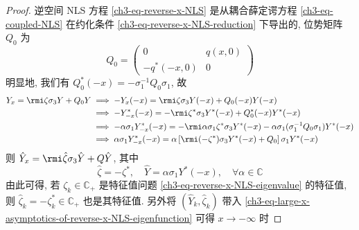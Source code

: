 \begin{proof}
    逆空间 NLS 方程 \eqref{ch3-eq-reverse-x-NLS} 是从耦合薛定谔方程 \eqref{ch3-eq-coupled-NLS} 在约化条件 \eqref{ch3-eq-reverse-x-NLS-reduction} 下导出的, 位势矩阵 $ Q_{0} $ 为
    \begin{equation}
        Q_{0} = \begin{pmatrix}
            0            & q(x,0) \\
            -q^{*}(-x,0) & 0
        \end{pmatrix}
    \end{equation}
    明显地, 我们有 $ Q_{0}^{*}(-x) = - \sigma^{-1}_{1} Q_{0} \sigma_{1} $, 故
    \begin{equation}
        \begin{aligned}
            Y_{x} = \rmi \zeta \sigma_{3} Y + Q_{0} Y & \implies -Y_{x}(-x) = \rmi \zeta \sigma_{3} Y(-x) + Q_{0}(-x)Y(-x)                                                                                                \\
                                                      & \implies -Y_{-x}^{*}(-x) = -\rmi \zeta^{*} \sigma_{3} Y^{*}(-x) + Q_{0}^{*}(-x)Y^{*}(-x)                                                                          \\
                                                      & \implies - \alpha \sigma_{1}Y_{-x}^{*}(-x) = -\rmi \alpha \sigma_{1} \zeta^{*} \sigma_{3} Y^{*}(-x) - \alpha \sigma_{1} (\sigma_{1}^{-1}Q_{0}\sigma_{1})Y^{*}(-x) \\
                                                      & \implies \alpha \sigma_{1}Y_{-x}^{*}(-x) = \alpha \left[\rmi  (-\zeta^{*}) \sigma_{3} Y^{*}(-x) + Q_{0} \right]\sigma_{1}Y^{*}(-x)                                \\
        \end{aligned}
    \end{equation}
    则 $ \hat{Y}_{x} = \rmi \hat{\zeta}\sigma_{3} \hat{Y} + Q \hat{Y} $, 其中
    \begin{equation}
        \hat{\zeta} = - \zeta^{*}, \quad \hat{Y} = \alpha \sigma_{1}Y^{*}(-x) , \quad \forall \alpha \in \mathbb{C} \label{symmetry-reverse-x}
    \end{equation}
    由此可得, 若 $ \zeta_{k} \in \mathbb{C}_{+} $ 是特征值问题 \eqref{ch3-eq-reverse-x-NLS-eigenvalue} 的特征值, 则 $ \hat{\zeta}_{k} = - \zeta_{k}^{*} \in \mathbb{C}_{+} $ 也是其特征值. 另外将 $(\hat{Y}_{k}, \hat{\zeta}_{k})$ 带入 \eqref{ch3-eq-large-x-asymptotics-of-reverse-x-NLS-eigenfunction} 可得 $x \to -\infty$ 时

\end{proof}
